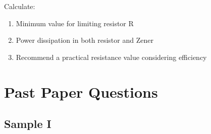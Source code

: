 \documentclass[a4paper,9pt,twoside,openany,twocolumn]{memoir}
\begin{document}
Calculate:
\begin{enumerate}
    \item Minimum value for limiting resistor R
    \item Power dissipation in both resistor and Zener
    \item Recommend a practical resistance value considering efficiency
\end{enumerate}
\onecolumn
\chapter{Past Paper Questions}
\section*{Sample I}
\end{document}
